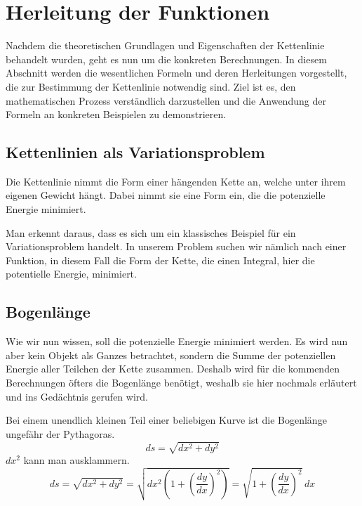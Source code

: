 %
%
%
%
\section{Herleitung der Funktionen\label{kettenlinie:section:Herleitung der Funktionen}}
Nachdem die theoretischen Grundlagen und Eigenschaften der Kettenlinie behandelt wurden, geht es nun um die konkreten Berechnungen.
In diesem Abschnitt werden die wesentlichen Formeln und deren Herleitungen vorgestellt, die zur Bestimmung der Kettenlinie notwendig sind.
Ziel ist es, den mathematischen Prozess verständlich darzustellen und die Anwendung der Formeln an konkreten Beispielen zu demonstrieren.

\subsection{Kettenlinien als Variationsproblem
\label{kettenlinie:subsection:Kettenlinien als Variationsproblem}}
Die Kettenlinie nimmt die Form einer hängenden Kette an, welche unter ihrem eigenen Gewicht hängt.
Dabei nimmt sie eine Form ein, die die potenzielle Energie minimiert.

Man erkennt daraus, dass es sich um ein klassisches Beispiel für ein Variationsproblem handelt.
In unserem Problem suchen wir nämlich nach einer Funktion, in diesem Fall die Form der Kette, die einen Integral, hier die potentielle Energie, minimiert.

\subsection{Bogenlänge
\label{kettenlinie:subsection:Bogenlänge}}
Wie wir nun wissen, soll die potenzielle Energie minimiert werden.
Es wird nun aber kein Objekt als Ganzes betrachtet, sondern die Summe der potenziellen Energie aller Teilchen der Kette zusammen.
Deshalb wird für die kommenden Berechnungen öfters die Bogenlänge benötigt, weshalb sie hier nochmals erläutert und ins Gedächtnis gerufen wird.

Bei einem unendlich kleinen Teil einer beliebigen Kurve ist die Bogenlänge ungefähr der Pythagoras.
\begin{equation}
	ds
	=
	\sqrt{dx^2 + dy^2}
	\label{kettenlinie:equation1}
\end{equation}
\(dx^2\) kann man ausklammern.
\begin{equation}
	ds
	=
	\sqrt{dx^2 + dy^2}
	=
	\sqrt{dx^2 \left( 1 + \left( \frac{dy}{dx} \right)^2 \right)}
	=
	\sqrt{1 + \left( \frac{dy}{dx} \right)^2} \, dx
\end{equation}

